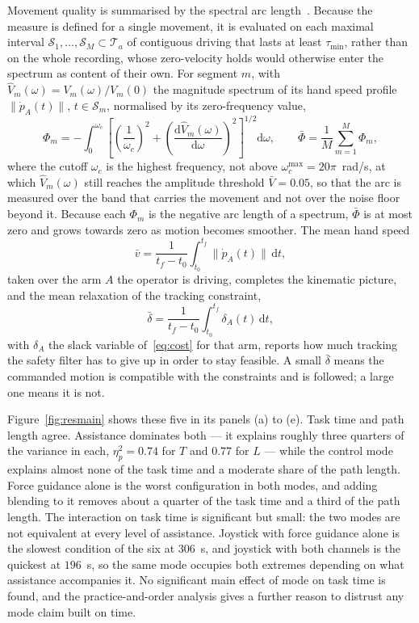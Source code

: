 Movement quality is summarised by the spectral arc length~\cite{balasubramanian2015sparc}. Because the measure is defined for a single movement, it is evaluated on each maximal interval $\mathcal{S}_1, \dots, \mathcal{S}_M \subset \mathcal{T}_a$ of contiguous driving that lasts at least $\tau_{\min}$, rather than on the whole recording, whose zero-velocity holds would otherwise enter the spectrum as content of their own. For segment $m$, with $\hat{V}_m(\omega) = V_m(\omega)/V_m(0)$ the magnitude spectrum of its hand speed profile $\lVert \dot{p}_A(t) \rVert$, $t \in \mathcal{S}_m$, normalised by its zero-frequency value,
\begin{equation}
\Phi_m = -\int_{0}^{\omega_c} \left[ \left(\frac{1}{\omega_c}\right)^{2} + \left(\frac{\mathrm{d}\hat{V}_m(\omega)}{\mathrm{d}\omega}\right)^{2} \right]^{1/2} \mathrm{d}\omega,
\qquad
\bar{\Phi} = \frac{1}{M} \sum_{m=1}^{M} \Phi_m,
\label{eq:mPhi}
\end{equation}
where the cutoff $\omega_c$ is the highest frequency, not above $\omega_c^{\max} = 20\pi$~rad/s, at which $\hat{V}_m(\omega)$ still reaches the amplitude threshold $\bar{V} = 0.05$, so that the arc is measured over the band that carries the movement and not over the noise floor beyond it. Because each $\Phi_m$ is the negative arc length of a spectrum, $\bar{\Phi}$ is at most zero and grows towards zero as motion becomes smoother. The mean hand speed
\begin{equation}
\bar{v} = \frac{1}{t_f-t_0} \int_{t_0}^{t_f} \lVert \dot{p}_A(t) \rVert \, \mathrm{d}t,
\label{eq:mv}
\end{equation}
taken over the arm $A$ the operator is driving, completes the kinematic picture, and the mean relaxation of the tracking constraint,
\begin{equation}
\bar{\delta} = \frac{1}{t_f-t_0} \int_{t_0}^{t_f} \delta_A(t) \, \mathrm{d}t,
\label{eq:mdelta}
\end{equation}
with $\delta_A$ the slack variable of~\eqref{eq:cost} for that arm, reports how much tracking the safety filter has to give up in order to stay feasible. A small $\bar{\delta}$ means the commanded motion is compatible with the constraints and is followed; a large one means it is not.

Figure~\ref{fig:resmain} shows these five in its panels (a) to (e). Task time and path length agree. Assistance dominates both --- it explains roughly three quarters of the variance in each, $\eta^2_p = 0.74$ for $T$ and $0.77$ for $L$ --- while the control mode explains almost none of the task time and a moderate share of the path length. Force guidance alone is the worst configuration in both modes, and adding blending to it removes about a quarter of the task time and a third of the path length. The interaction on task time is significant but small: the two modes are not equivalent at every level of assistance. Joystick with force guidance alone is the slowest condition of the six at $306$~s, and joystick with both channels is the quickest at $196$~s, so the same mode occupies both extremes depending on what assistance accompanies it. No significant main effect of mode on task time is found, and the practice-and-order analysis gives a further reason to distrust any mode claim built on time.

